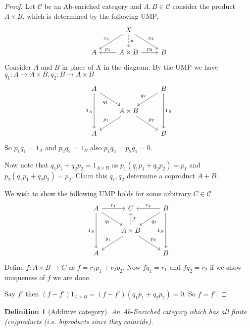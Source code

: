 \documentclass[12pt]{report}
\numberwithin{equation}{section}
\newtheorem{definition}[dummy]{Definition}
\begin{document}
	\begin{proof}	
		Let $\mathcal{C}$ be an Ab-enriched category and $A,B\in \mathcal{C}$ consider the product $A\times B$, which is determined by the following UMP,
		\[\begin{tikzcd}
			& X \\
			A & A\times B & B
			\arrow["{p_1}"', from=2-2, to=2-1]
			\arrow["{p_2}", from=2-2, to=2-3]
			\arrow["u", dashed, from=1-2, to=2-2]
			\arrow["{x_1}"', from=1-2, to=2-1]
			\arrow["{x_2}", from=1-2, to=2-3]
		\end{tikzcd}\]
		Consider $A$ and $B$ in place of $X $ in the diagram. By the UMP we have $q_1: A \to A\times B, q_2: B \to A\times B$
		\[\begin{tikzcd}
			A && B \\
			& {A\times B} \\
			A && B
			\arrow["{p_1}"', from=2-2, to=3-1]
			\arrow["{p_2}", from=2-2, to=3-3]
			\arrow["{q_2}"', from=1-3, to=2-2]
			\arrow["{q_1}"', from=1-1, to=2-2]
			\arrow["{1_A}"', from=1-1, to=3-1]
			\arrow["{1_B}", from=1-3, to=3-3]
		\end{tikzcd}\]
		So $p_1q_1=1_A$ and $p_2q_2=1_B$ also $p_1q_2=p_2q_1=0$.
		
		Now note that $q_1p_1+q_2p_2=1_{A\times B}$ as $p_1(q_1p_1+q_2p_2)=p_1$ and $p_2(q_1p_1+q_2p_2)=p_2$. Claim this $q_1,q_2$ determine a coproduct $A +B$.
		
		We wish to show the following UMP holds for some arbitrary $C \in \mathcal{C}$
		\[\begin{tikzcd}
			A & C & B \\
			& {A\times B} \\
			A && B
			\arrow["{q_1}"', from=1-1, to=2-2]
			\arrow["{q_2}", from=1-3, to=2-2]
			\arrow["{p_1}"', from=2-2, to=3-1]
			\arrow["{p_2}", from=2-2, to=3-3]
			\arrow["{1_B}"', from=1-3, to=3-3]
			\arrow["{1_A}"', from=1-1, to=3-1]
			\arrow["{r_1}", from=1-1, to=1-2]
			\arrow["{r_2}"', from=1-3, to=1-2]
			\arrow["{f}"',dashed, from=2-2, to=1-2]
		\end{tikzcd}\]
		Define $f: A\times B \to C$ as $f=r_1p_1+r_2p_2$. Now $fq_1=r_1$ and $fq_2=r_2$ if we show uniqueness of $f$ we are done.
		
		Say $f'$ then $(f-f')1_{A \times B}=(f-f')(q_1p_1+q_2p_2)=0$. So $f=f'$.
		
		
	\end{proof}
	
	
	\begin{definition}[Additive category]
		An Ab-Enriched category which has all finite (co)products (i.e. biproducts since they coincide).
	\end{definition}
	
\end{document}
